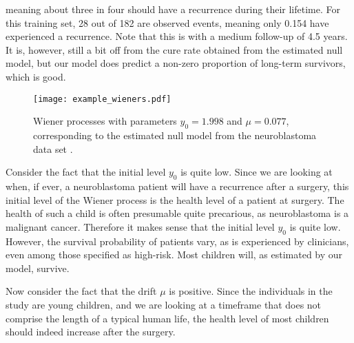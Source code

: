 meaning about three in four should have a recurrence during their lifetime.
For this training set, 28 out of 182 are observed events, meaning only 0.154 have experienced a recurrence.
Note that this is with a medium follow-up of 4.5 years.
It is, however, still a bit off from the cure rate obtained from the estimated null model, but our model does predict a non-zero proportion of long-term survivors, which is good.
\begin{figure}
\caption{Wiener processes with parameters $y_0=1.998$ and $\mu=0.077$, corresponding to the estimated null model from the neuroblastoma data set \citep{oberthuer-data}.}
\label{fig:neuroblastoma-wien}
\centering
\texttt{[image: example\_wieners.pdf]}
\end{figure}

Consider the fact that the initial level $y_0$ is quite low.
Since we are looking at when, if ever, a neuroblastoma patient will have a recurrence after a surgery, this initial level of the Wiener process is the health level of a patient at surgery.
The health of such a child is often presumable quite precarious, as neuroblastoma is a malignant cancer.
Therefore it makes sense that the initial level $y_0$ is quite low.
However, the survival probability of patients vary, as is experienced by clinicians, even among those specified as high-risk.
Most children will, as estimated by our model, survive.

Now consider the fact that the drift $\mu$ is positive.
Since the individuals in the study are young children, and we are looking at a timeframe that does not comprise the length of a typical human life, the health level of most children should indeed increase after the surgery.

